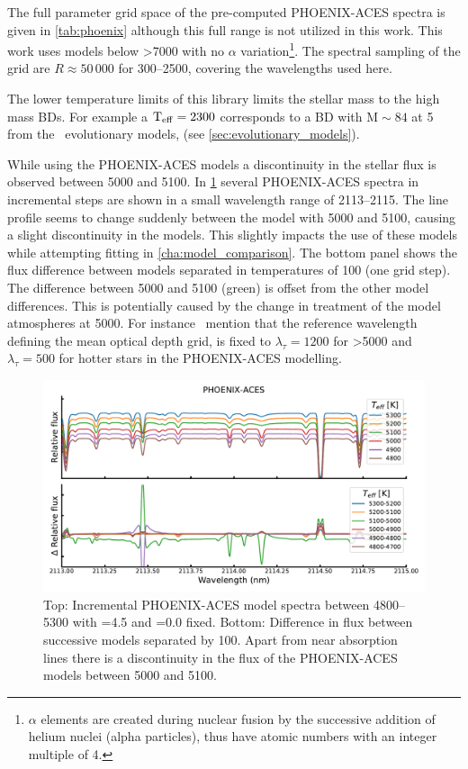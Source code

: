 The full parameter grid space of the pre-computed {PHOENIX-ACES} spectra is given in \cref{tab:phoenix} although this full range is not utilized in this work.
This work uses models below >7000\K{} with no \(\alpha\) variation\footnote{$\alpha$ elements are created during nuclear fusion by the successive addition of helium nuclei (alpha particles), thus have atomic numbers with an integer multiple of 4.}.
The spectral sampling of the grid are $R \approx 50\,000$ for 300--2500\nm, covering the wavelengths used here.



The lower temperature limits of this library limits the stellar mass to the high mass BDs.
For example a \(\textrm{T}_{\mathrm{eff}}{}=2300\)\K{} corresponds to a {BD} with \(\textrm{M}\sim84\)\Mjup{} at 5\Gyr{} from the~\citet{baraffe_evolutionary_2003} evolutionary models, (see \cref{sec:evolutionary_models}).


While using the {PHOENIX-ACES} models a discontinuity in the stellar flux is observed between 5000\K{} and 5100\K{}.
In \cref{fig:phoenixdiffereceat5000k} several {PHOENIX-ACES} spectra in incremental steps are shown in a small wavelength range of 2113--2115\nm{}.
The line profile seems to change suddenly between the model with 5000\K{} and 5100\K{}, causing a slight discontinuity in the models.
This slightly impacts the use of these models while attempting \textchisquared{} fitting in \cref{cha:model_comparison}.
The bottom panel shows the flux difference between models separated in temperatures of 100\K{} (one grid step).
The difference between 5000 and 5100\K{} (green) is offset from the other model differences.
This is potentially caused by the change in treatment of the model atmospheres at 5000\K{}.
For instance~\citet{husser_new_2013} mention that the reference wavelength defining the mean optical depth grid, is fixed to $\lambda_{\tau}=1200$\nm{} for \Teff{}>5000\K{} and $\lambda_{\tau}=500$\nm{} for hotter stars in the {PHOENIX-ACES} modelling.

\begin{figure}
    \centering
    \includegraphics[width=0.7\linewidth]{figures/atmos_and_models/phoenix_differece_at_5000K}
    \caption[Difference in successive {PHOENIX-ACES} spectra around 5000\K.]{Top: Incremental {PHOENIX-ACES} model spectra between 4800--5300\K{} with \logg{}=4.5 and \feh{}=0.0 fixed.
    Bottom: Difference in flux between successive models separated by 100\K{}.
    Apart from near absorption lines there is a discontinuity in the flux of the {PHOENIX-ACES} models between 5000 and 5100\K{}.}
    \label{fig:phoenixdiffereceat5000k}
\end{figure}


